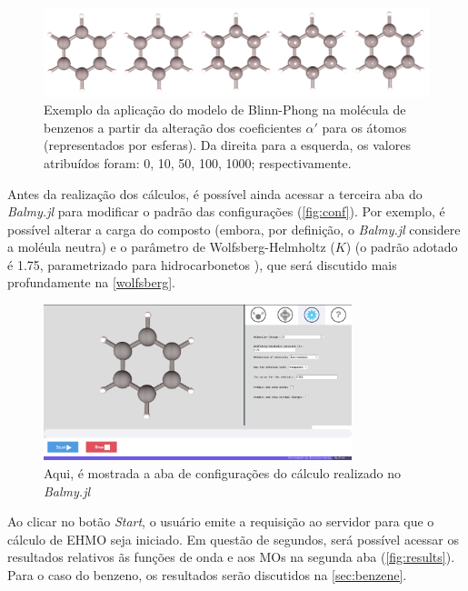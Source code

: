 
\begin{figure}[htb]
\caption{\label{fig:representations} Exemplo da aplicação do modelo de Blinn-Phong na molécula de benzenos a partir da alteração dos coeficientes $\alpha'$ para os átomos (representados por esferas). Da direita para a esquerda, os valores atribuídos foram: 0, 10, 50, 100, 1000; respectivamente.}
	\begin{center}
		\includegraphics[width=1.0\textwidth]{images/shininess(1).png}
	\end{center}
\end{figure}

Antes da realização dos cálculos, é possível ainda acessar a terceira aba do \textit{Balmy.jl} para modificar o padrão das configurações (\autoref{fig:conf}). Por exemplo, é possível alterar a carga do composto (embora, por definição, o \textit{Balmy.jl} considere a moléula neutra) e o parâmetro de Wolfsberg-Helmholtz ($K$) (o padrão adotado é 1.75, parametrizado para hidrocarbonetos \autocite{Hoffmann1963}), que será discutido mais profundamente na \autoref{wolfsberg}.

\begin{figure}[htb]
	\caption{\label{fig:conf} Aqui, é mostrada a aba de configurações do cálculo realizado no \textit{Balmy.jl}}
	\begin{center}
		\includegraphics[width=0.8\textwidth]{images/conf.png}
	\end{center}
\end{figure}


Ao clicar no botão \textit{Start}, o usuário emite a requisição ao servidor para que o cálculo de \gls{EHMO} seja iniciado. Em questão de segundos, será possível acessar os resultados relativos ãs funções de onda e aos \gls{MOs} na segunda aba (\autoref{fig:results}). Para o caso do benzeno, os resultados serão discutidos na \autoref{sec:benzene}.


